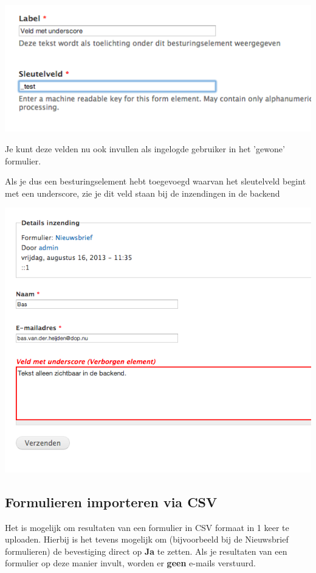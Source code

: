 \begin{center}
\includegraphics[width=\textwidth]{img/verborgenveld1.png}
\end{center}
Je kunt deze velden nu ook invullen als ingelogde gebruiker in het 'gewone' formulier.

Als je dus een besturingselement hebt toegevoegd waarvan het sleutelveld begint met een underscore, zie je dit veld staan bij de inzendingen in de backend

\begin{center}
\includegraphics[width=\textwidth]{img/verborgenveld2.png}
\end{center}

\subsection{Formulieren importeren via CSV}

Het is mogelijk om resultaten van een formulier in CSV formaat in 1 keer te uploaden. Hierbij is het tevens mogelijk om (bijvoorbeeld bij de Nieuwsbrief formulieren) de bevestiging direct op \textbf{Ja} te zetten. Als je resultaten van een formulier op deze manier invult, worden er \textbf{geen} e-mails verstuurd.

